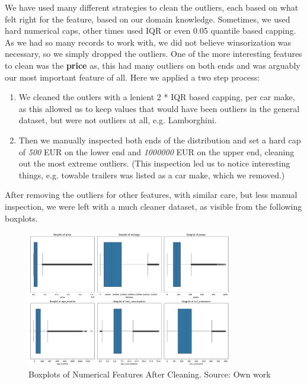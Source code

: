 \documentclass[12pt]{article}
\begin{document}
We have used many different strategies to clean the outliers, each based on what felt right for the feature, based on our domain knowledge. Sometimes, we used hard numerical caps, other times used IQR or even 0.05 quantile based capping. As we had so many records to work with, we did not believe winsorization was necessary, so we simply dropped the outliers.
One of the more interesting features to clean was the \textbf{price} as, this had many outliers on both ends and was arguably our most important feature of all. Here we applied a two step process:

\begin{enumerate}
  \item We cleaned the outlers with a lenient 2 * IQR based capping, per car make, as this allowed us to keep values that would have been outliers in the general dataset, but were not outliers at all, e.g. Lamborghini.
  \item Then we manually inspected both ends of the distribution and set a hard cap of \textit{500} EUR on the lower end and \textit{1000000} EUR on the upper end, cleaning out the most extreme outliers. (This inspection led us to notice interesting things, e.g. towable trailers was listed as a car make, which we removed.)
\end{enumerate}

After removing the outliers for other features, with similar care, but less manual inspection, we were left with a much cleaner dataset, as visible from the following boxplots.

\begin{figure}[ht]
  \centering
  \includegraphics[width=0.8\textwidth]{./images/boxplots_after.png}
  \caption{Boxplots of Numerical Features After Cleaning. Source: Own work}
  \label{fig:boxplots_after}
\end{figure}
\end{document}
